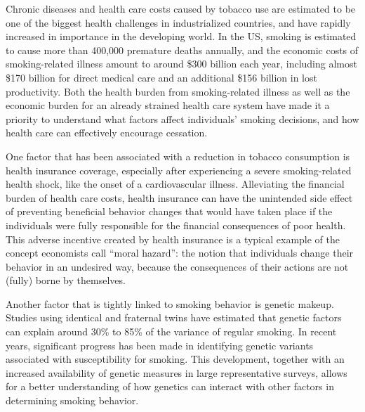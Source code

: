 \documentclass[12pt]{article}
\begin{document}


\lettrine[lines=3,lraise=0.01, nindent=0em, slope=0em]{\textcolor{NavyBlue}{\textsf{C}}}{}hronic diseases and health care costs caused by tobacco use are estimated to be one of the biggest health challenges in industrialized countries, and have rapidly increased in importance in the developing world.\cite{USDHHS2014,Goodchild2018} In the US, smoking is estimated to cause more than 400,000 premature deaths annually,\cite{Ma2018} and the economic costs of smoking-related illness amount to around \$300 billion each year, including almost \$170 billion for direct medical care and an additional \$156 billion in lost productivity.\cite{USDHHS2014, Xu2015} Both the health burden from smoking-related illness as well as the economic burden for an already strained health care system have made it a priority to understand what factors affect individuals' smoking decisions, and how health care can effectively encourage cessation.

One factor that has been associated with a reduction in tobacco consumption is health insurance coverage\cite{Richards2014,Marti2017}, especially after experiencing a severe smoking-related health shock, like the onset of a cardiovascular illness.\cite{Clark2002,Falba2005,Khwaja2006learn,Keenan2009,Sundmacher2012}
Alleviating the financial burden of health care costs, health insurance can have the unintended side effect of preventing beneficial behavior changes that would have taken place if the individuals were fully responsible for the financial consequences of poor health.\cite{Marti2017} This adverse incentive created by health insurance is a typical example of the concept economists call ``moral hazard'': the notion that individuals change their behavior in an undesired way, because the consequences of their actions are not (fully) borne by themselves.\cite{Einav2018,Zweifel2000}

Another factor that is tightly linked to smoking behavior is genetic makeup. Studies using identical and fraternal twins have estimated that genetic factors can explain around 30\% to 85\% of the variance of regular smoking.\cite{Heath1993, Sullivan1999, Hall2002, Li2003, Boardman2010} In recent years, significant progress has been made in identifying genetic variants associated with susceptibility for smoking.\cite{Liu2010,Thorgeirsson2008,Thorgeirsson2010,TAG2010,Liu2018gwas} This development, together with an increased availability of genetic measures in large representative surveys, allows for a better understanding of how genetics can interact with other factors in determining smoking behavior.
\end{document}
